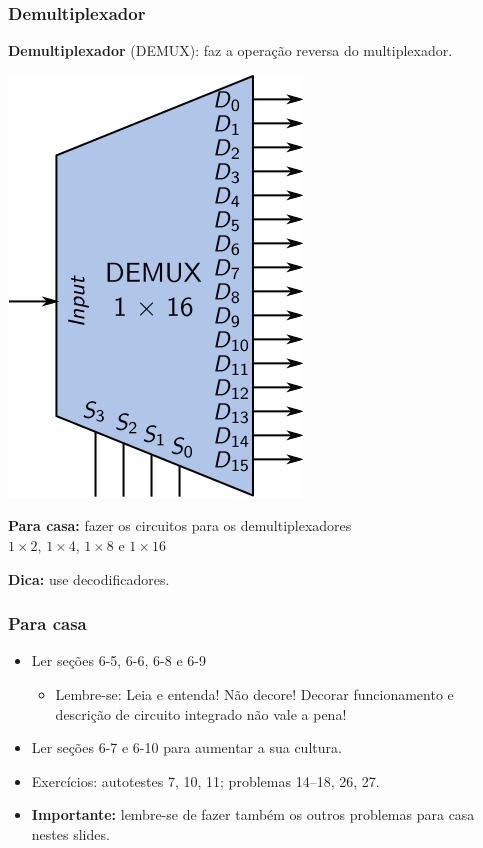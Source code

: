 \documentclass{beamer}
\begin{document}
\begin{frame}
\frametitle{Demultiplexador}

\textbf{Demultiplexador} (DEMUX): faz a operação reversa do multiplexador.

\begin{center}
\begin{minipage}{0.4\textwidth}
\includegraphics{images/demux1x16}
\end{minipage}
\hspace{0.1\textwidth}
\pause
\begin{minipage}{0.4\textwidth}
\textbf{Para casa:} fazer os circuitos para os
demultiplexadores\\ $1 \times 2$, $1 \times 4$,
$1 \times 8$ e $1 \times 16$

\vspace{12pt}
\textbf{Dica:} use decodificadores.
\end{minipage}
\end{center}

\end{frame}

\begin{frame}
\frametitle{Para casa}

\begin{itemize}
\item Ler seções 6-5, 6-6, 6-8 e 6-9
\begin{itemize}
\item Lembre-se: Leia e entenda! Não decore! Decorar funcionamento e
descrição de circuito integrado não vale a pena!
\end{itemize}
\item Ler seções 6-7 e 6-10 para aumentar a sua cultura.
\item Exercícios: autotestes 7, 10, 11; problemas 14--18, 26, 27.
\item \textbf{Importante:} lembre-se de fazer também os outros
problemas para casa nestes slides.
\end{itemize}
\end{frame}
\end{document}
